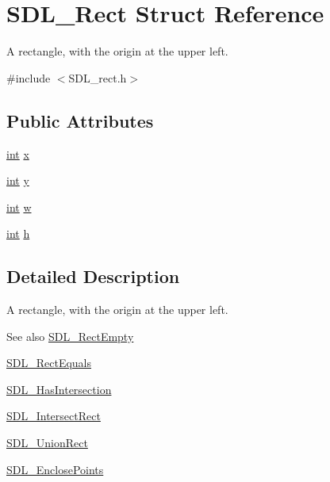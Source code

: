 \hypertarget{struct_s_d_l___rect}{}\section{S\+D\+L\+\_\+\+Rect Struct Reference}
\label{struct_s_d_l___rect}


A rectangle, with the origin at the upper left.  




{\ttfamily \#include $<$S\+D\+L\+\_\+rect.\+h$>$}

\subsection*{Public Attributes}
\begin{DoxyCompactItemize}
\item 
\hyperlink{_s_d_l__thread_8h_a6a64f9be4433e4de6e2f2f548cf3c08e}{int} \hyperlink{struct_s_d_l___rect_a85418d94621dd6855805c4b5c7bf6482}{x}
\item 
\hyperlink{_s_d_l__thread_8h_a6a64f9be4433e4de6e2f2f548cf3c08e}{int} \hyperlink{struct_s_d_l___rect_a822694af8ddca5fd0d5d94e47106ab85}{y}
\item 
\hyperlink{_s_d_l__thread_8h_a6a64f9be4433e4de6e2f2f548cf3c08e}{int} \hyperlink{struct_s_d_l___rect_a56b7be5738fb6fab86881534a814c45e}{w}
\item 
\hyperlink{_s_d_l__thread_8h_a6a64f9be4433e4de6e2f2f548cf3c08e}{int} \hyperlink{struct_s_d_l___rect_a0a17d46b320af8063b746153348edd72}{h}
\end{DoxyCompactItemize}


\subsection{Detailed Description}
A rectangle, with the origin at the upper left. 

\begin{DoxySeeAlso}{See also}
\hyperlink{_s_d_l__rect_8h_aac0e9b5d3f34baec6a2cde95bb01f49c}{S\+D\+L\+\_\+\+Rect\+Empty} 

\hyperlink{_s_d_l__rect_8h_a156979fd3561cf90b87741d11057262a}{S\+D\+L\+\_\+\+Rect\+Equals} 

\hyperlink{_s_d_l__rect_8h_a191ec0b069421d4a36304b475697e847}{S\+D\+L\+\_\+\+Has\+Intersection} 

\hyperlink{_s_d_l__rect_8h_aff8e3dd3b1a25443cd7c8cf02a087290}{S\+D\+L\+\_\+\+Intersect\+Rect} 

\hyperlink{_s_d_l__rect_8h_a659f2c25335202888408c95195823f9c}{S\+D\+L\+\_\+\+Union\+Rect} 

\hyperlink{_s_d_l__rect_8h_afcbb58dbba760b9e6fdb4b5d1ece015c}{S\+D\+L\+\_\+\+Enclose\+Points} 
\end{DoxySeeAlso}


